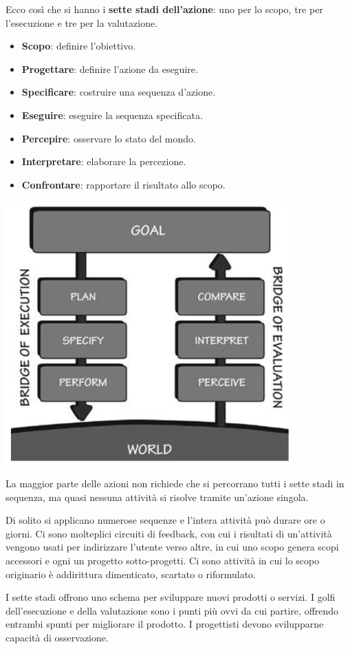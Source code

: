 Ecco così che si hanno i \textbf{sette stadi dell'azione}: uno per lo scopo, tre per l'esecuzione e tre per la valutazione.
\begin{itemize}
	\item \textbf{Scopo}: definire l'obiettivo.
	\item \textbf{Progettare}: definire l'azione da eseguire.
	\item \textbf{Specificare}: costruire una sequenza d'azione.
	\item \textbf{Eseguire}: eseguire la sequenza specificata.
	\item \textbf{Percepire}: osservare lo stato del mondo.
	\item \textbf{Interpretare}: elaborare la percezione.
	\item \textbf{Confrontare}: rapportare il risultato allo scopo.
\end{itemize}
\begin{center}
	\includegraphics[width=0.5\linewidth]{"immagini/Sette stadi"}
\end{center}
La maggior parte delle azioni non richiede che si percorrano tutti i sette stadi in sequenza, ma quasi nessuna attività si risolve tramite un'azione singola.

Di solito si applicano numerose sequenze e l'intera attività può durare ore o giorni. Ci sono molteplici circuiti di feedback, con cui i risultati di un'attività vengono usati per indirizzare l'utente verso altre, in cui uno scopo genera scopi accessori e ogni un progetto sotto-progetti. Ci sono attività in cui lo scopo originario è addirittura dimenticato, scartato o riformulato.

I sette stadi offrono uno schema per sviluppare nuovi prodotti o servizi. I golfi dell'esecuzione e della valutazione sono i punti più ovvi da cui partire, offrendo entrambi spunti per migliorare il prodotto. I progettisti devono svilupparne capacità di osservazione.

